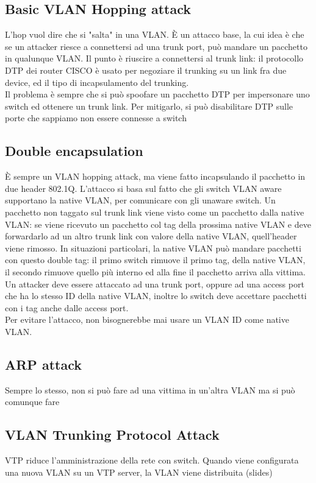 \documentclass[12pt, oneside]{extbook} %
\begin{document}
\subsection{Basic VLAN Hopping attack}
L'hop vuol dire che si "salta" in una VLAN. È un attacco base, la cui idea è che se un attacker riesce a connettersi ad una trunk port, può mandare un pacchetto in qualunque VLAN. Il punto è riuscire a connettersi al trunk link: il protocollo DTP dei router CISCO è usato per negoziare il trunking su un link fra due device, ed il tipo di incapsulamento del trunking.\\ Il problema è sempre che si può spoofare un pacchetto DTP per impersonare uno switch ed ottenere un trunk link. Per mitigarlo, si può disabilitare DTP sulle porte che sappiamo non essere connesse a switch
\subsection{Double encapsulation}
È sempre un VLAN hopping attack, ma viene fatto incapsulando il pacchetto in due header 802.1Q. L'attacco si basa sul fatto che gli switch VLAN aware supportano la native VLAN, per comunicare con gli unaware switch. Un pacchetto non taggato sul trunk link viene visto come un pacchetto dalla native VLAN: se viene ricevuto un pacchetto col tag della prossima native VLAN e deve forwardarlo ad un altro trunk link con valore della native VLAN, quell'header viene rimosso. In situazioni particolari, la native VLAN può mandare pacchetti con questo double tag: il primo switch rimuove il primo tag, della native VLAN, il secondo rimuove quello più interno ed alla fine il pacchetto arriva alla vittima. Un attacker deve essere attaccato ad una trunk port, oppure ad una access port che ha lo stesso ID della native VLAN, inoltre lo switch deve accettare pacchetti con i tag anche dalle access port.\\ Per evitare l'attacco, non bisognerebbe mai usare un VLAN ID come native VLAN.
\subsection{ARP attack}
Sempre lo stesso, non si può fare ad una vittima in un'altra VLAN ma si può comunque fare
\subsection{VLAN Trunking Protocol Attack}
VTP riduce l'amministrazione della rete con switch. Quando viene configurata una nuova VLAN su un VTP server, la VLAN viene distribuita (slides)
\end{document}
